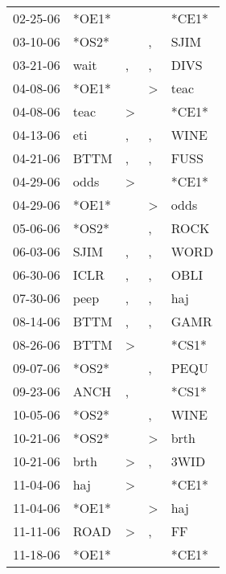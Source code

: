 \begin{supertabular}{lllll}
 02-25-06 &  *OE1* &                  &                  &  *CE1* \\
 03-10-06 &  *OS2* &                  &                , &   SJIM \\
 03-21-06 &   wait &                , &                , &   DIVS \\
 04-08-06 &  *OE1* &                  &     \textgreater &   teac \\
 04-08-06 &   teac &     \textgreater &                  &  *CE1* \\
 04-13-06 &    eti &                , &                , &   WINE \\
 04-21-06 &   BTTM &                , &                , &   FUSS \\
 04-29-06 &   odds &     \textgreater &                  &  *CE1* \\
 04-29-06 &  *OE1* &                  &     \textgreater &   odds \\
 05-06-06 &  *OS2* &                  &                , &   ROCK \\
 06-03-06 &   SJIM &                , &                , &   WORD \\
 06-30-06 &   ICLR &                , &                , &   OBLI \\
 07-30-06 &   peep &                , &                , &    haj \\
 08-14-06 &   BTTM &                , &                , &   GAMR \\
 08-26-06 &   BTTM &     \textgreater &                  &  *CS1* \\
 09-07-06 &  *OS2* &                  &                , &   PEQU \\
 09-23-06 &   ANCH &                , &                  &  *CS1* \\
 10-05-06 &  *OS2* &                  &                , &   WINE \\
 10-21-06 &  *OS2* &                  &     \textgreater &   brth \\
 10-21-06 &   brth &     \textgreater &                , &   3WID \\
 11-04-06 &    haj &     \textgreater &                  &  *CE1* \\
 11-04-06 &  *OE1* &                  &     \textgreater &    haj \\
 11-11-06 &   ROAD &     \textgreater &                , &     FF \\
 11-18-06 &  *OE1* &                  &                  &  *CE1* \\

\end{supertabular}
